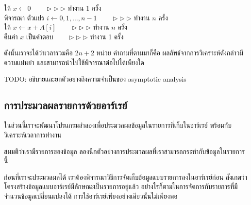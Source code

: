\begin{algt}
\noindent \hspace*{0.2in} ให้ $x\leftarrow 0$   \ \ \ \ $\rhd\rhd\rhd$ ทำงาน 1 ครั้ง\\
\hspace*{0.2in} พิจารณา ตัวแปร $i\leftarrow 0,1,\ldots,n-1$  \ \ \ \ $\rhd\rhd\rhd$ ทำงาน $n$ ครั้ง\\
\hspace*{0.2in}\hspace*{0.2in} ให้ $x \leftarrow x + A[i]$  \ \ \ \ $\rhd\rhd\rhd$ ทำงาน $n$ ครั้ง\\
\hspace*{0.2in} คืน{\wbr}ค่า $x$ เป็น{\wbr}คำตอบ  \ \ \ \ $\rhd\rhd\rhd$ ทำงาน 1 ครั้ง{\wbr}
\end{algt}

ดังนั้น{\wbr}เรา{\wbr}จะ{\wbr}ได้{\wbr}ว่า{\wbr}เวลา{\wbr}รวม{\wbr}คือ $2n + 2$ หน่วย คำถาม{\wbr}ที่{\wbr}ตาม{\wbr}มา{\wbr}ก็{\wbr}คือ{\wbr}
ผลลัพธ์{\wbr}จาก{\wbr}การ{\wbr}วิเคราะห์{\wbr}ดังกล่าว{\wbr}มี{\wbr}ความ{\wbr}แม่นยำ และ{\wbr}สามารถ{\wbr}นำ{\wbr}ไป{\wbr}ใช้{\wbr}พิจารณา{\wbr}ต่อไป{\wbr}ได้{\wbr}เพียงใด{\wbr}

TODO: อธิบาย{\wbr}และ{\wbr}ยก{\wbr}ตัวอย่าง{\wbr}ถึง{\wbr}ความจำ{\wbr}เป็น{\wbr}ของ asymptotic analysis

\subsection{การ{\wbr}ประมวลผล{\wbr}รายการ{\wbr}ด้วย{\wbr}อาร์เรย์}

ใน{\wbr}ส่วน{\wbr}นี้{\wbr}เรา{\wbr}จะ{\wbr}พัฒนา{\wbr}โปรแกรม{\wbr}ลำ{\wbr}ลอง{\wbr}เพื่อ{\wbr}ประมวลผล{\wbr}ข้อมูล{\wbr}ใน{\wbr}รายการ{\wbr}ที่{\wbr}เก็บ{\wbr}ใน{\wbr}อาร์เรย์
พร้อมกับ{\wbr}วิเคราะห์{\wbr}เวลา{\wbr}การ{\wbr}ทำงาน{\wbr}

\begin{quiz}{}
สมมติ{\wbr}ว่า{\wbr}เรา{\wbr}มี{\wbr}รายการ{\wbr}ของ{\wbr}ข้อมูล ลอง{\wbr}นึก{\wbr}ตัวอย่าง{\wbr}การ{\wbr}ประมวลผล{\wbr}ที่{\wbr}เรา{\wbr}สามารถ{\wbr}กระทำ{\wbr}กับ{\wbr}ข้อมูล{\wbr}ใน{\wbr}รายการ{\wbr}นี้{\wbr}
\end{quiz}

ก่อน{\wbr}ที่{\wbr}เรา{\wbr}จะ{\wbr}ประมวลผล{\wbr}ได้ เรา{\wbr}ต้อง{\wbr}พิจารณา{\wbr}วิธีการ{\wbr}จัด{\wbr}เก็บ{\wbr}ข้อมูล{\wbr}แบบ{\wbr}รายการ{\wbr}ลง{\wbr}ใน{\wbr}อาร์เรย์{\wbr}ก่อน{\wbr}
สังเกต{\wbr}ว่า{\wbr}โครงสร้าง{\wbr}ข้อมูล{\wbr}แบบ{\wbr}อาร์เรย์{\wbr}มี{\wbr}ลักษณะ{\wbr}เป็น{\wbr}รายการ{\wbr}อยู่{\wbr}แล้ว{\wbr}
อย่างไรก็ตาม{\wbr}ใน{\wbr}การ{\wbr}จัดการ{\wbr}กับ{\wbr}รายการ{\wbr}ที่{\wbr}มี{\wbr}จำนวน{\wbr}ข้อมูล{\wbr}เปลี่ยนแปลง{\wbr}ได้{\wbr}
การ{\wbr}ใช้{\wbr}อาร์เรย์{\wbr}เพียง{\wbr}อย่างเดียว{\wbr}นั้น{\wbr}ไม่{\wbr}เพียงพอ{\wbr}

